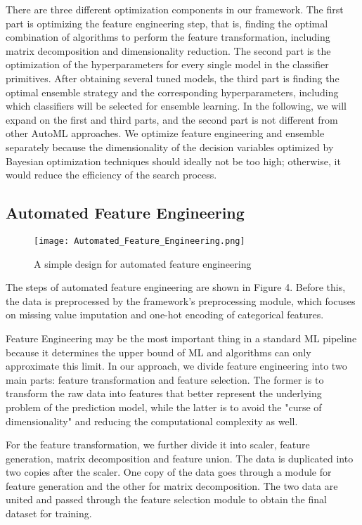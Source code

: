 \documentclass[review]{elsarticle}
\begin{document}
There are three different optimization components in our framework. The first part is optimizing the feature engineering step, that is, finding the optimal combination of algorithms to perform the feature transformation, including matrix decomposition and dimensionality reduction. The second part is the optimization of the hyperparameters for every single model in the classifier primitives. After obtaining several tuned models, the third part is finding the optimal ensemble strategy and the corresponding hyperparameters, including which classifiers will be selected for ensemble learning. In the following, we will expand on the first and third parts, and the second part is not different from other AutoML approaches. We optimize feature engineering and ensemble separately because the dimensionality of the decision variables optimized by Bayesian optimization techniques should ideally not be too high; otherwise, it would reduce the efficiency of the search process.
\subsection{Automated Feature Engineering}
\begin{figure}[htbp]
	\centering
	\texttt{[image: Automated\_Feature\_Engineering.png]}
	\caption{A simple design for automated feature engineering}
\end{figure}

The steps of automated feature engineering are shown in Figure 4. Before this, the data is preprocessed by the framework's preprocessing module, which focuses on missing value imputation and one-hot encoding of categorical features.

Feature Engineering may be the most important thing in a standard ML pipeline because it determines the upper bound of ML and algorithms can only approximate this limit. In our approach, we divide feature engineering into two main parts: feature transformation and feature selection\cite{motoda2002feature}\cite{dash1997feature}. The former is to transform the raw data into features that better represent the underlying problem of the prediction model, while the latter is to avoid the "curse of dimensionality" and reducing the computational complexity as well.

For the feature transformation, we further divide it into scaler, feature generation, matrix decomposition and feature union. The data is duplicated into two copies after the scaler. One copy of the data goes through a module for feature generation and the other for matrix decomposition. The two data are united and passed through the feature selection module to obtain the final dataset for training.
\end{document}
